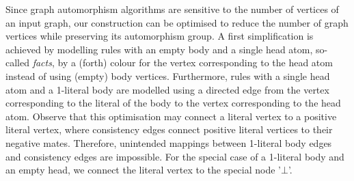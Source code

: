 \documentclass[envcountsame]{llncs}
\begin{document}
Since graph automorphism algorithms are sensitive to the number of vertices of an input graph, our construction can be optimised to reduce the number of graph vertices while preserving its automorphism group. A first simplification is achieved by modelling rules with an empty body and a single head atom, so-called \emph{facts}, by a (forth) colour for the vertex corresponding to the head atom instead of using (empty) body vertices. Furthermore, rules with a single head atom and a 1-literal body are modelled using a directed edge from the vertex corresponding to the literal of the body to the vertex corresponding to the head atom. Observe that this optimisation may connect a literal vertex to a positive literal vertex, where consistency edges connect positive literal vertices to their negative mates. Therefore, unintended mappings between 1-literal body edges and consistency edges are impossible. For the special case of a 1-literal body and an empty head, we connect the literal vertex to the special node '$\bot$'.
\end{document}
